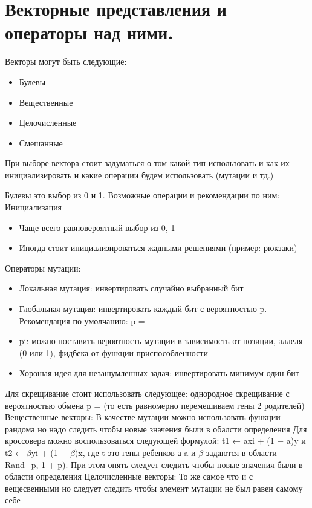 \section{Векторные представления и операторы над ними.}
Векторы могут быть следующие: 
\begin{itemize}
\item Булевы
\item Вещественные
\item Целочисленные
\item Смешанные
\end{itemize}
При выборе вектора стоит задуматься о том какой тип использовать и как их инициализировать и какие операции будем использовать (мутации и тд.)

Булевы это выбор из 0 и 1. 
Возможные операции и рекомендации по ним:
Инициализация
\begin{itemize}
\item Чаще всего равновероятный выбор из {0, 1}
\item Иногда стоит инициализироваться жадными решениями (пример: рюкзаки)
\end{itemize}
Операторы мутации:
\begin{itemize}
\item Локальная мутация: инвертировать случайно выбранный бит
\item Глобальная мутация: инвертировать каждый бит с вероятностью p. Рекомендация по умолчанию: p = 
\item pi: можно поставить вероятность мутации в зависимость от позиции, аллеля (0 или 1), фидбека от функции приспособленности
\item Хорошая идея для незашумленных задач: инвертировать минимум один бит
\end{itemize}
Для скрещивание стоит использовать следующее: однородное скрещивание с вероятностью обмена p =  (то есть равномерно перемешиваем гены 2 родителей)
Вещественные векторы:
В качестве мутации можно использовать функции рандома но надо следить чтобы новые значения были в обалсти определения
Для кроссовера можно воспользоваться следующей формулой: t1 ← axi + (1 − a)y и t2 ← $\beta$yi + (1 − $\beta$)x, где t это гены ребенков а a и $\beta$ задаются в области Rand−p, 1 + p). При этом опять следует следить чтобы новые значения были в области определения
Целочисленные векторы:
То же самое что и с вещесвенными но следует следить чтобы элемент мутации не был равен самому себе
